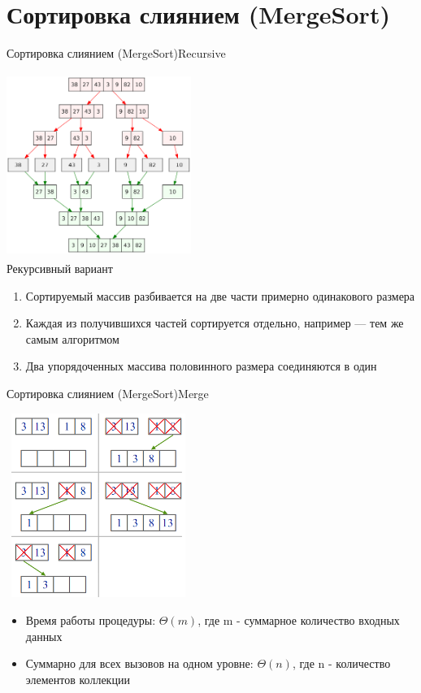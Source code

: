 \documentclass[10pt]{beamer}
\begin{document}
\section{Сортировка слиянием (MergeSort)}
\begin{frame}[fragile]{Сортировка слиянием (MergeSort)}{Recursive}
\begin{multicols}{2}
\includegraphics[width=6cm, height=6cm]{Term_1/Source/Pirctures/Merge_sort_algorithm.png}\\
\vfill\eject
Рекурсивный вариант
\begin{enumerate}
    \item Сортируемый массив разбивается на две части примерно одинакового размера
    \item Каждая из получившихся частей сортируется отдельно, например — тем же самым алгоритмом
    \item Два упорядоченных массива половинного размера соединяются в один
\end{enumerate}
\end{multicols}

\end{frame}

\begin{frame}[fragile]{Сортировка слиянием (MergeSort)}{Merge}
\begin{multicols}{2}
\includegraphics[width=6cm, height=6cm]{Term_1/Source/Pirctures/Merging_two_arrays.png}\\
\vfill\eject
\begin{itemize}
    \item Время работы процедуры: $\Theta(m)$, где m - суммарное количество входных данных
    \item Суммарно для всех вызовов на одном уровне: $\Theta(n)$, где n - количество элементов коллекции
\end{itemize}
\end{multicols}
\end{frame}
\end{document}
